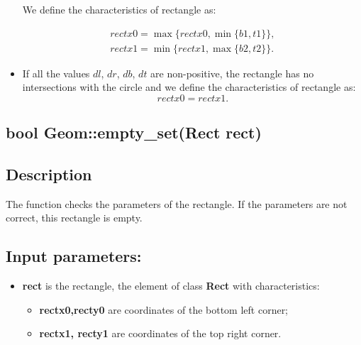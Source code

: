 \documentclass{report}
\begin{document}
\begin{itemize}
	We define the characteristics of rectangle as:
	
	\begin{equation}
		\begin{gathered}
			rectx0 = \max\{rectx0, \min\{b1, t1\}\},\\
			rectx1 = \min\{rectx1, \max\{b2, t2\}\}.
		\end{gathered}
	\end{equation}
	
	\item If all the values $dl$, $dr$, $db$, $dt$  are non-positive,  the rectangle has no intersections with the circle and we define the characteristics of rectangle as: 
	\begin{equation}
		rectx0 = rectx1.
		\label{eq:empty}
	\end{equation}
	
\end{itemize}	

\label{Empty}
\begin{center} 
	\section*{\bfseries bool Geom::empty\_set(Rect rect)}
\end{center} 

\subsection*{Description}

The function checks the parameters of the rectangle. If the parameters are not correct, this rectangle is empty. 

\subsection*{Input parameters:}

\begin{itemize}
	\item {\bfseries	rect} is the rectangle, the element of class {\bfseries Rect} with characteristics:
	
	\begin{itemize}
		\item {\bfseries rectx0,recty0} are coordinates of the bottom left corner;
		\item {\bfseries rectx1, recty1} are coordinates of the top right corner.
	\end{itemize}
\end{itemize}
\end{document}
